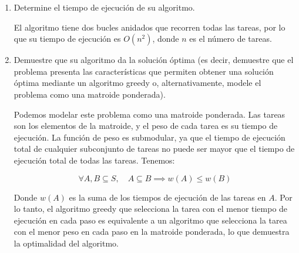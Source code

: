 \begin{problema}
\begin{enumerate}
\begin{sol}
\begin{verbatim}
            \end{verbatim}
        \end{sol}
        \item Determine el tiempo de ejecución de su algoritmo.
        \begin{sol}
            El algoritmo tiene dos bucles anidados que recorren todas las tareas, por lo que su tiempo de ejecución es $O(n^2)$, donde $n$ es el número de tareas.
        \end{sol}
        \item Demuestre que su algoritmo da la solución óptima (es decir, demuestre que el problema presenta las características que permiten obtener una solución óptima mediante un algoritmo greedy o, alternativamente, modele el problema como una matroide ponderada).
        \begin{sol}
    Podemos modelar este problema como una matroide ponderada. Las tareas son los elementos de la matroide, y el peso de cada tarea es su tiempo de ejecución. La función de peso es submodular, ya que el tiempo de ejecución total de cualquier subconjunto de tareas no puede ser mayor que el tiempo de ejecución total de todas las tareas. Tenemos: 

$$
\forall A, B \subseteq S, \quad A \subseteq B \implies w(A) \leq w(B)
$$

Donde $w(A)$ es la suma de los tiempos de ejecución de las tareas en $A$. Por lo tanto, el algoritmo greedy que selecciona la tarea con el menor tiempo de ejecución en cada paso es equivalente a un algoritmo que selecciona la tarea con el menor peso en cada paso en la matroide ponderada, lo que demuestra la optimalidad del algoritmo.
        \end{sol}
    \end{enumerate}



\end{problema}


